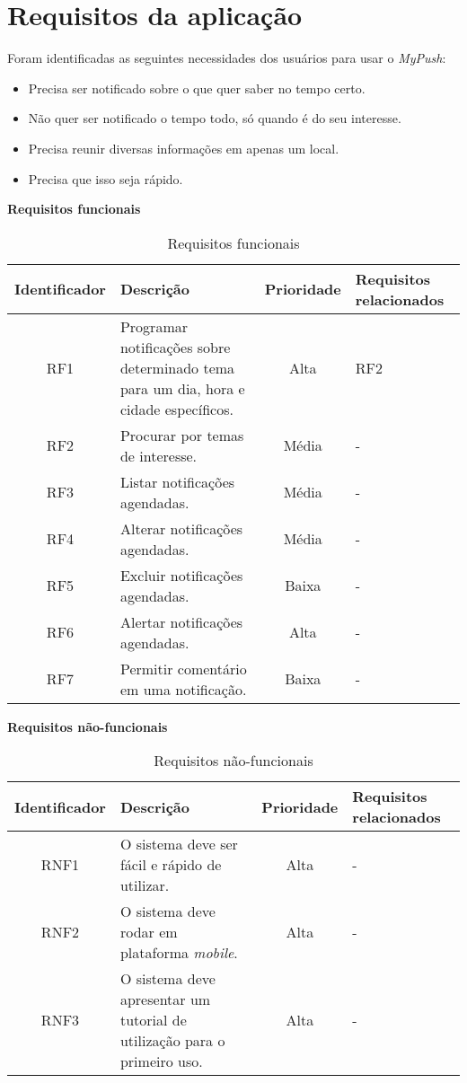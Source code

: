 \chapter{Requisitos da aplicação}

Foram identificadas as seguintes necessidades dos usuários para usar o \textit{MyPush}:

\begin{itemize}
 \item Precisa ser notificado sobre o que quer saber no tempo certo.
 \item Não quer ser notificado o tempo todo, só quando é do seu interesse.
 \item Precisa reunir diversas informações em apenas um local.
 \item Precisa que isso seja rápido.
\end{itemize}

\textbf{Requisitos funcionais}

\begin{table}[h]
\centering
  \begin{tabular}{|c|m{6cm}|c|m{2.6cm}|}

  \hline
  \textbf{Identificador} & \textbf{Descrição} & \textbf{Prioridade} & \textbf{Requisitos relacionados}\\
  \hline                               
  RF1 & Programar notificações sobre determinado tema para um dia, hora e cidade específicos. & Alta & RF2\\
  \hline
  RF2 & Procurar por temas de interesse. & Média & -\\
  \hline
  RF3 & Listar notificações agendadas. & Média & -\\
  \hline
  RF4 & Alterar notificações agendadas. & Média & -\\
  \hline
  RF5 & Excluir notificações agendadas. & Baixa & -\\
  \hline
  RF6 & Alertar notificações agendadas. & Alta & -\\
  \hline
  RF7 & Permitir comentário em uma notificação. & Baixa & -\\
  \hline
  \end{tabular}
  \caption[Requisitos funcionais]{Requisitos funcionais}
\end{table}

\textbf{Requisitos não-funcionais}

\begin{table}[h]
  \centering
  \begin{tabular}{|c|m{6cm}|c|m{2.6cm}|}

  \hline
  \textbf{Identificador} & \textbf{Descrição} & \textbf{Prioridade} & \textbf{Requisitos relacionados}\\
  \hline                               
  RNF1 & O sistema deve ser fácil e rápido de utilizar. & Alta & -\\
  \hline
  RNF2 & O sistema deve rodar em plataforma \textit{mobile}. & Alta & -\\
  \hline
  RNF3 & O sistema deve apresentar um tutorial de utilização para o primeiro uso. & Alta & -\\
  \hline
  \end{tabular}
  \caption[Requisitos não-funcionais]{Requisitos não-funcionais}
\end{table}